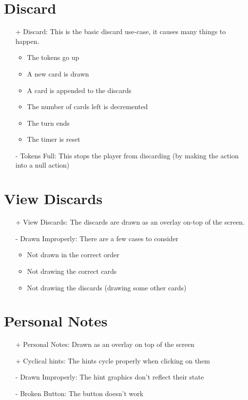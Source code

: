 \documentclass[12pt]{article}
\begin{document}
\section{Discard}

\begin{itemize}
\item[+] Discard: This is the basic discard use-case, it causes many things to happen.
\begin{itemize}
\item The tokens go up
\item A new card is drawn
\item A card is appended to the discards
\item The number of cards left is decremented
\item The turn ends
\item The timer is reset
\end{itemize}

\item [-] Tokens Full: This stops the player from discarding (by making the action
into a null action)

\end{itemize}

\section{View Discards}

\begin{itemize}
\item[+] View Discards: The discards are drawn as an overlay on-top of the screen.

\item[-] Drawn Improperly: There are a few cases to consider
\begin{itemize}
\item Not drawn in the correct order
\item Not drawing the correct cards
\item Not drawing the discards (drawing some other cards)
\end{itemize}

\end{itemize}

\section{Personal Notes}

\begin{itemize}
\item[+] Personal Notes: Drawn as an overlay on top of the screen
\item[+] Cyclical hints: The hints cycle properly when clicking on them

\item[-] Drawn Improperly: The hint graphics don't reflect their state
\item[-] Broken Button: The button doesn't work

\end{itemize}
\end{document}

